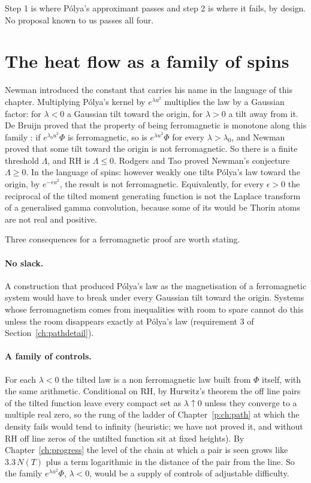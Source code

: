 Step 1 is where P\'olya's approximant passes and step 2 is where it fails, by design. No proposal known to us passes all four.

\section{The heat flow as a family of spins}\label{f:sec:heat}

Newman \cite{Newman1976} introduced the constant that carries his name in the language of this chapter. Multiplying P\'olya's kernel by $e^{\lambda u^2}$ multiplies the law by a Gaussian factor: for $\lambda<0$ a Gaussian tilt toward the origin, for $\lambda>0$ a tilt away from it. De Bruijn proved that the property of being ferromagnetic is monotone along this family \cite{deBruijn}: if $e^{\lambda_0u^2}\Phi$ is ferromagnetic, so is $e^{\lambda u^2}\Phi$ for every $\lambda>\lambda_0$, and Newman proved that some tilt toward the origin is not ferromagnetic. So there is a finite threshold $\Lambda$, and RH is $\Lambda\le0$. Rodgers and Tao \cite{RodgersTao} proved Newman's conjecture $\Lambda\ge0$. In the language of spins: however weakly one tilts P\'olya's law toward the origin, by $e^{-\epsilon u^2}$, the result is not ferromagnetic. Equivalently, for every $\epsilon>0$ the reciprocal of the tilted moment generating function is not the Laplace transform of a generalised gamma convolution, because some of its would be Thorin atoms are not real and positive.

Three consequences for a ferromagnetic proof are worth stating.

\paragraph{No slack.} A construction that produced P\'olya's law as the magnetisation of a ferromagnetic system would have to break under every Gaussian tilt toward the origin. Systems whose ferromagnetism comes from inequalities with room to spare cannot do this unless the room disappears exactly at P\'olya's law (requirement 3 of Section~\ref{ch:pathdetail}).

\paragraph{A family of controls.} For each $\lambda<0$ the tilted law is a non ferromagnetic law built from $\Phi$ itself, with the same arithmetic. Conditional on RH, by Hurwitz's theorem the off line pairs of the tilted function leave every compact set as $\lambda\uparrow0$ unless they converge to a multiple real zero, so the rung of the ladder of Chapter~\ref{p:ch:path} at which the density fails would tend to infinity (heuristic; we have not proved it, and without RH off line zeros of the untilted function sit at fixed heights). By Chapter~\ref{ch:progress} the level of the chain at which a pair is seen grows like $3.3\,N(T)$ plus a term logarithmic in the distance of the pair from the line. So the family $e^{\lambda u^2}\Phi$, $\lambda<0$, would be a supply of controls of adjustable difficulty.


